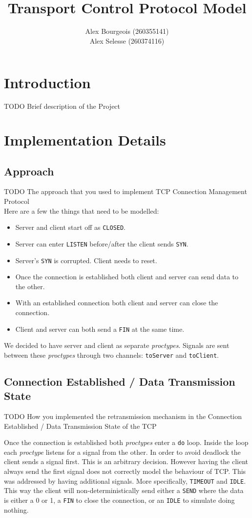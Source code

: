 \documentclass{WigReport}
\title{Transport Control Protocol Model}
\author{Alex Bourgeois (260355141) \\
Alex Selesse (260374116)}
\begin{document}
\MakeTitlePage
\tableofcontents
\clearpage

\section{Introduction}

TODO Brief description of the Project

\section{Implementation Details}

\subsection{Approach}

TODO The approach that you used to implement TCP Connection Management Protocol
\\

Here are a few the things that need to be modelled:
\begin{itemize}
\item Server and client start off as \verb|CLOSED|.
\item Server can enter \verb|LISTEN| before/after the client sends \verb|SYN|.
\item Server's \verb|SYN| is corrupted. Client needs to reset.
\item Once the connection is established both client and server can send data to the other.
\item With an established connection both client and server can close the connection.
\item Client and server can both send a \verb|FIN| at the same time.
\end{itemize}

We decided to have server and client as separate \textit{proctypes}. Signals are sent between these \textit{proctypes} through two channels: \verb|toServer| and \verb|toClient|.

\subsection{Connection Established / Data Transmission State}

TODO How you implemented the retransmission mechanism in the Connection Established / Data Transmission State of the TCP

Once the connection is established both \textit{proctypes} enter a \verb|do| loop. Inside the loop each \textit{proctype} listens for a signal from the other. In order to avoid deadlock the client sends a signal first. This is an arbitrary decision. However having the client always send the first signal does not correctly model the behaviour of TCP. This was addressed by having additional signals. More specifically, \verb|TIMEOUT| and \verb|IDLE|. This way the client will non-deterministically send either a \verb|SEND| where the data is either a 0 or 1, a \verb|FIN| to close the connection, or an \verb|IDLE| to simulate doing nothing.
\end{document}
